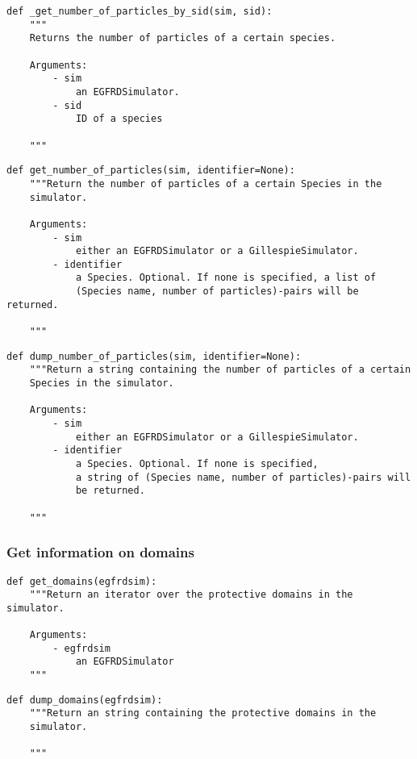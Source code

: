 \documentclass[a4paper,10pt]{article}
\begin{document}
\begin{verbatim}
def _get_number_of_particles_by_sid(sim, sid):
    """ 
    Returns the number of particles of a certain species.

    Arguments:
        - sim
            an EGFRDSimulator.
        - sid
            ID of a species    

    """
\end{verbatim}

\begin{verbatim}
def get_number_of_particles(sim, identifier=None):
    """Return the number of particles of a certain Species in the 
    simulator.

    Arguments:
        - sim
            either an EGFRDSimulator or a GillespieSimulator.
        - identifier
            a Species. Optional. If none is specified, a list of 
            (Species name, number of particles)-pairs will be returned.

    """ 
\end{verbatim}

\begin{verbatim}
def dump_number_of_particles(sim, identifier=None):
    """Return a string containing the number of particles of a certain 
    Species in the simulator.

    Arguments:
        - sim
            either an EGFRDSimulator or a GillespieSimulator.
        - identifier
            a Species. Optional. If none is specified, 
            a string of (Species name, number of particles)-pairs will 
            be returned.

    """ 
\end{verbatim}

\subsubsection{Get information on domains}

\begin{verbatim}
def get_domains(egfrdsim):
    """Return an iterator over the protective domains in the simulator.

    Arguments:
        - egfrdsim
            an EGFRDSimulator
    """
\end{verbatim}

\begin{verbatim}
def dump_domains(egfrdsim):
    """Return an string containing the protective domains in the 
    simulator.

    """
\end{verbatim}
\end{document}
